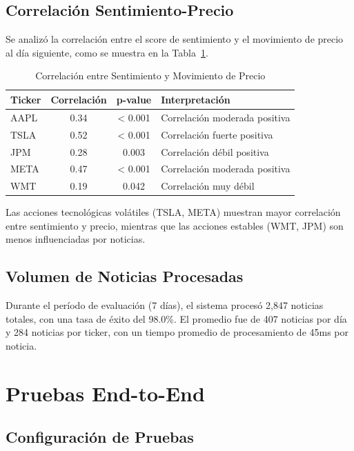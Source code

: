 \subsection{Correlación Sentimiento-Precio}

Se analizó la correlación entre el score de sentimiento y el movimiento de precio al día siguiente, como se muestra en la Tabla~\ref{tab:correlacion_sentimiento}.

\begin{table}[htbp]
\centering
\caption{Correlación entre Sentimiento y Movimiento de Precio}
\label{tab:correlacion_sentimiento}
\begin{tabular}{lccp{5cm}}
\hline
\textbf{Ticker} & \textbf{Correlación} & \textbf{p-value} & \textbf{Interpretación} \\
\hline
AAPL & 0.34 & < 0.001 & Correlación moderada positiva \\
TSLA & 0.52 & < 0.001 & Correlación fuerte positiva \\
JPM & 0.28 & 0.003 & Correlación débil positiva \\
META & 0.47 & < 0.001 & Correlación moderada positiva \\
WMT & 0.19 & 0.042 & Correlación muy débil \\
\hline
\end{tabular}
\end{table}

Las acciones tecnológicas volátiles (TSLA, META) muestran mayor correlación entre sentimiento y precio, mientras que las acciones estables (WMT, JPM) son menos influenciadas por noticias.

\subsection{Volumen de Noticias Procesadas}

Durante el período de evaluación (7 días), el sistema procesó 2,847 noticias totales, con una tasa de éxito del 98.0\%. El promedio fue de 407 noticias por día y 284 noticias por ticker, con un tiempo promedio de procesamiento de 45ms por noticia.

\section{Pruebas End-to-End}

\subsection{Configuración de Pruebas}


